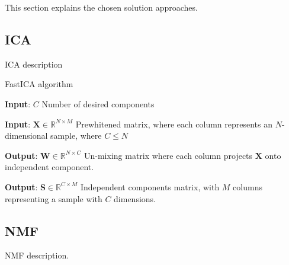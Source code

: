 \documentclass[../main.tex]{subfiles} %
\begin{document}
This section explains the chosen solution approaches.

\subsection{ICA}

ICA description

\begin{algorithm} 
\begin{algorithmic}
\caption{FastICA algorithm}\label{fastica}
\item \textbf{Input}: $C$ Number of desired components
\item \textbf{Input}: $\mathbf{X} \in \mathbb{R}^{N \times M}$ Prewhitened matrix, where each column represents an $N$-dimensional sample, where $C \le N$ 
\item \textbf{Output}: $\mathbf{W} \in \mathbb{R}^{N \times C}$ Un-mixing matrix where each column projects $\mathbf{X}$ onto independent component.
\item \textbf{Output}: $\mathbf{S} \in \mathbb{R}^{C \times M}$ Independent components matrix, with $M$ columns representing a sample with $C$ dimensions.

	\EndWhile
\EndFor
{}
\EndFunction

\end{algorithmic}
\end{algorithm}



\subsection{NMF}

NMF description.	
\end{document}
